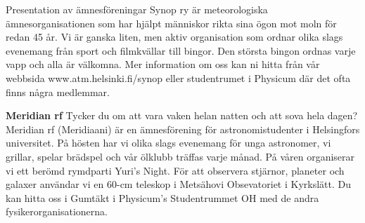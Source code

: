 \documentclass{spektraklet}
\begin{document}
\begin{artikel}{Presentation av ämnesföreningar}{}
Synop ry är meteorologiska ämnesorganisationen som har hjälpt människor rikta sina
ögon mot moln för redan 45 år. Vi är ganska liten, men aktiv organisation som ordnar olika
slags evenemang från sport och filmkvällar till bingor. Den största bingon ordnas varje vapp
och alla är välkomna. Mer information om oss kan ni hitta från vår webbsida www.atm.helsinki.fi/synop eller studentrumet i Physicum där det ofta finns några medlemmar.

\textbf{Meridian rf}
Tycker du om att vara vaken helan natten och att sova hela dagen? Meridian rf
(Meridiaani) är en ämnesförening för astronomistudenter i Helsingfors universitet. På hösten
har vi olika slags evenemang för unga astronomer, vi grillar, spelar brädspel och vår ölklubb träffas varje månad. På våren organiserar vi ett berömd rymdparti Yuri's Night. För att observera stjärnor, planeter och galaxer användar vi en 60-cm teleskop i Metsähovi
Obsevatoriet i Kyrkslätt. Du kan hitta oss i Gumtäkt i Physicum's Studentrummet OH med de
andra fysikerorganisationerna.

\end{artikel}
\end{document}
